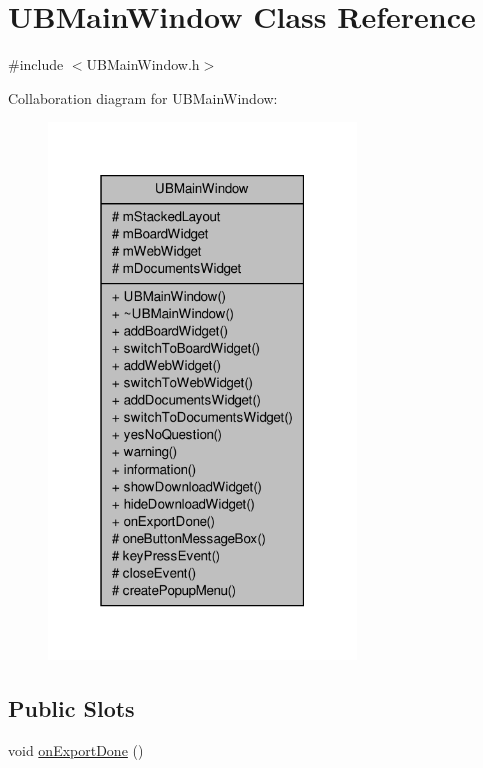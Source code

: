 \hypertarget{class_u_b_main_window}{\section{U\-B\-Main\-Window Class Reference}
\label{d8/d9e/class_u_b_main_window}
}


{\ttfamily \#include $<$U\-B\-Main\-Window.\-h$>$}



Collaboration diagram for U\-B\-Main\-Window\-:
\nopagebreak
\begin{figure}[H]
\begin{center}
\leavevmode
\includegraphics[width=232pt]{da/d4c/class_u_b_main_window__coll__graph}
\end{center}
\end{figure}
\subsection*{Public Slots}
\begin{DoxyCompactItemize}
\item 
void \hyperlink{class_u_b_main_window_ac33f900982ea29925fb2bcd088d4633c}{on\-Export\-Done} ()
\end{DoxyCompactItemize}
